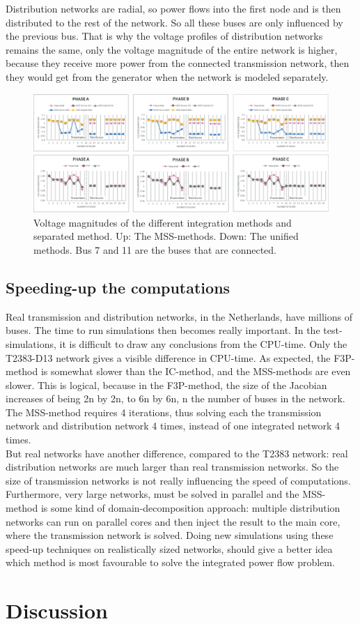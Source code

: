 \documentclass[10pt,journal]{article}
\begin{document}
Distribution networks are radial, so power flows into the first node and is then distributed to the rest of the network. So all these buses are only influenced by the previous bus. That is why the voltage profiles of distribution networks remains the same, only the voltage magnitude of the entire network is higher, because they receive more power from the connected transmission network, then they would get from the generator when the network is modeled separately. 
\begin{figure}[h!]
    \centering
    \includegraphics[width=\textwidth]{Images/Enumathpaper.eps}
    \caption{Voltage magnitudes of the different integration methods and separated method. Up: The MSS-methods. Down: The unified methods. Bus 7 and 11 are the buses that are connected.}
    \label{fig:voltmag}
\end{figure}
\subsection{Speeding-up the computations}
Real transmission and distribution networks, in the Netherlands, have millions of buses. The time to run simulations then becomes really important. In the test-simulations, it is difficult to draw any conclusions from the CPU-time. Only the T2383-D13 network gives a visible difference in CPU-time. As expected, the F3P-method is somewhat slower than the IC-method, and the MSS-methods are even slower. This is logical, because in the F3P-method, the size of the Jacobian increases of being 2n by 2n, to 6n by 6n, n the number of buses in the network. The MSS-method requires 4 iterations, thus solving each the transmission network and distribution network 4 times, instead of one integrated network 4 times. \\
But real networks have another difference, compared to the T2383 network: real distribution networks are much larger than real transmission networks. So the size of transmission networks is not really influencing the speed of computations. Furthermore, very large networks, must be solved in parallel and the MSS-method is some kind of domain-decomposition approach: multiple distribution networks can run on parallel cores and then inject the result to the main core, where the transmission network is solved. Doing new simulations using these speed-up techniques on realistically sized networks, should give a better idea which method is most favourable to solve the integrated power flow problem. 
\section{Discussion}

\newpage

 
\end{document}
